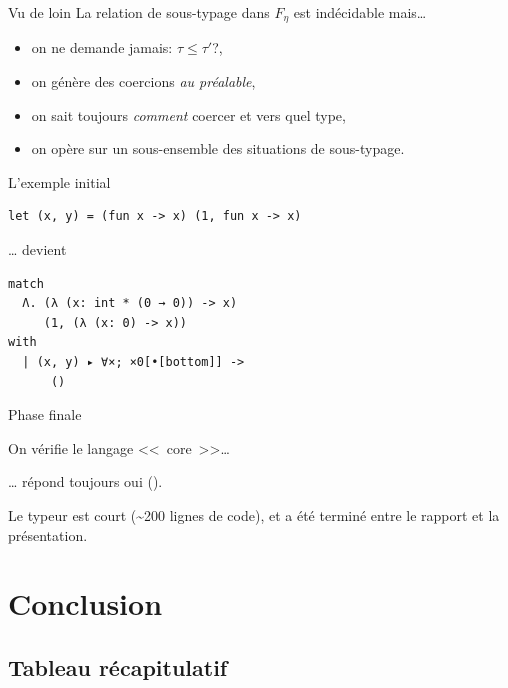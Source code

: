 \documentclass[final]{beamer}
\begin{document}
\begin{frame}{Vu de loin}
  La relation de sous-typage dans $F_\eta$ est indécidable mais…
  \begin{itemize}
    \item on ne demande jamais: $\tau \leq \tau'$?,
    \item on génère des coercions \emph{au préalable},
    \item on sait toujours \emph{comment} coercer et vers quel type,
    \item on opère sur un sous-ensemble des situations de sous-typage.
  \end{itemize}
\end{frame}

\begin{frame}[fragile]{L'exemple initial}

  \begin{verbatim}
let (x, y) = (fun x -> x) (1, fun x -> x)
  \end{verbatim}

  … devient

  \begin{verbatim}
match
  Λ. (λ (x: int * (0 → 0)) -> x)
     (1, (λ (x: 0) -> x))
with
  | (x, y) ▸ ∀×; ×0[•[bottom]] ->
      ()
  \end{verbatim}

\end{frame}

\begin{frame}{Phase finale}
  \begin{center}
On vérifie le langage <<~core~>>…

\vspace{5ex}

… répond toujours oui ().
  \end{center}

  \vspace{2em}

  Le typeur est court (\textasciitilde 200 lignes de code), et a été terminé entre
  le rapport et la présentation.
\end{frame}

\section{Conclusion}

\subsection{Tableau récapitulatif}
\end{document}
